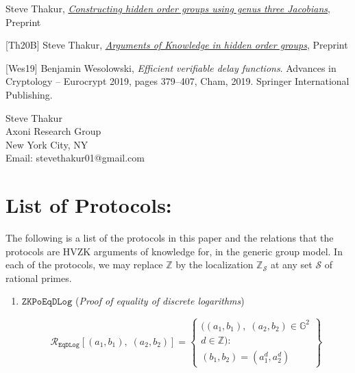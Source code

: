 \documentclass[11pt, lettersize, notitlepage, leqno, footskip=0.6cm]{article}
\newcommand{\bz}{\mathbb Z}
\newcommand{\ttt}{\texttt}
\newcommand{\mc}{\mathcal}
\newcommand{\mb}{\mathbb}
\newcommand{\noin}{\noindent}
\numberwithin{equation}{section}
\begin{document}
{{{\noin [Th20A] Steve Thakur, \href{https://eprint.iacr.org/2020/348}{\textit{Constructing hidden order groups using genus three Jacobians}}, Preprint \vspace{0.1cm}

\noin \hypertarget{Th20}{[Th20B]} Steve Thakur, \href{https://eprint.iacr.org/2020/1617}{\textit{Arguments of Knowledge in hidden order groups}}, Preprint \vspace{0.1cm} 


\noin \hypertarget{Wes18}{[Wes19]} Benjamin Wesolowski, \textit{Efficient verifiable delay functions}. Advances in Cryptology – Eurocrypt 2019, pages 379–407, Cham, 2019. Springer International Publishing.\vspace{0.1cm}




\bigskip

\normalsize

\noin Steve Thakur\\
Axoni Research Group\\
New York City, NY\\
Email: stevethakur01@gmail.com 


\newpage

\appendix

\section{\fontsize{11}{11}\selectfont List of Protocols:}

\hypertarget{List}{The following is a list of the protocols in this paper and the relations that the protocols are HVZK arguments of knowledge for, in the generic group model. In each of the protocols, we may replace $\bz$ by the localization $\bz_{\mc{S}}$ at any set $\mc{S}$ of rational primes.}

\begin{enumerate}[wide, labelwidth=!, labelindent=0pt]

\item $\ttt{ZKPoEqDLog}$ (\textit{Proof of equality of discrete logarithms}) \vspace{-0.3cm}

\[
  \mc{R}_{{\ttt{EqDLog}}}[(a_1, b_1),\;(a_2,b_2)] = \left\{\begin{array}{l}
    ((a_1, b_1), \; (a_2,b_2)\in\mb{G}^2\\
    d\in\mb{Z}): \\
    (b_1,b_2) = (a_1^d,a_2^d)
  \end{array}\right\}
\]


\end{enumerate}}}}
\end{document}
